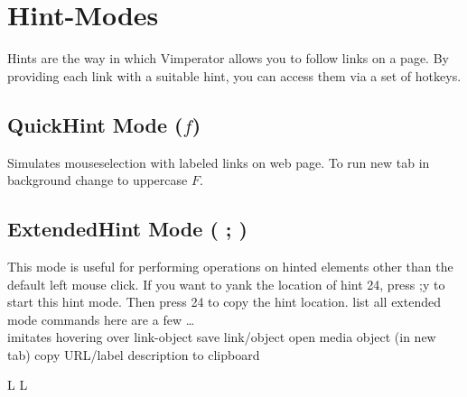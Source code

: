 \section{Hint-Modes}{Hints are the way in which Vimperator allows you to follow links on a page. By
providing each link with a suitable hint, you can access them via a set of hotkeys. }
\subsection{QuickHint Mode ($f$)}{Simulates mouseselection with labeled
links on web page. To run new tab in background change to uppercase $F$.}
\subsection{ExtendedHint Mode ( ; )}{This mode is useful for
performing operations on hinted elements other than the default
left mouse click. If you want to yank the location of hint 24, press ;y to start this hint
mode. Then press 24 to copy the hint location.}
	{list all extended mode commands}
here are a few \ldots\\
\cmdS{;~}	{imitates hovering over link-object}
	{save link/object}
	{open media object (in new tab)}
	{copy URL/label description to clipboard}

\copyrightnotice

\vfil
\supereject
\if L\lr \else\null\vfill\eject\fi
\if L\lr \else\null\vfill\eject\fi
\bye

